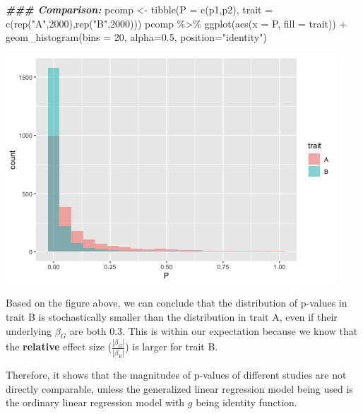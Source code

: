 \documentclass[
]{article}
\newenvironment{Shaded}{\begin{snugshade}}{\end{snugshade}}
\newcommand{\AttributeTok}[1]{\textcolor[rgb]{0.77,0.63,0.00}{#1}}
\newcommand{\DecValTok}[1]{\textcolor[rgb]{0.00,0.00,0.81}{#1}}
\newcommand{\DocumentationTok}[1]{\textcolor[rgb]{0.56,0.35,0.01}{\textbf{\textit{#1}}}}
\newcommand{\FloatTok}[1]{\textcolor[rgb]{0.00,0.00,0.81}{#1}}
\newcommand{\FunctionTok}[1]{\textcolor[rgb]{0.00,0.00,0.00}{#1}}
\newcommand{\NormalTok}[1]{#1}
\newcommand{\OtherTok}[1]{\textcolor[rgb]{0.56,0.35,0.01}{#1}}
\newcommand{\SpecialCharTok}[1]{\textcolor[rgb]{0.00,0.00,0.00}{#1}}
\newcommand{\StringTok}[1]{\textcolor[rgb]{0.31,0.60,0.02}{#1}}
\begin{document}
\begin{Shaded}
\begin{Highlighting}[]
\DocumentationTok{\#\#\# Comparison:}
\NormalTok{pcomp }\OtherTok{\textless{}{-}} \FunctionTok{tibble}\NormalTok{(}\AttributeTok{P =} \FunctionTok{c}\NormalTok{(p1,p2), }\AttributeTok{trait =} \FunctionTok{c}\NormalTok{(}\FunctionTok{rep}\NormalTok{(}\StringTok{"A"}\NormalTok{,}\DecValTok{2000}\NormalTok{),}\FunctionTok{rep}\NormalTok{(}\StringTok{"B"}\NormalTok{,}\DecValTok{2000}\NormalTok{)))}
\NormalTok{pcomp }\SpecialCharTok{\%\textgreater{}\%} \FunctionTok{ggplot}\NormalTok{(}\FunctionTok{aes}\NormalTok{(}\AttributeTok{x =}\NormalTok{ P, }\AttributeTok{fill =}\NormalTok{ trait)) }\SpecialCharTok{+} \FunctionTok{geom\_histogram}\NormalTok{(}\AttributeTok{bins =} \DecValTok{20}\NormalTok{, }\AttributeTok{alpha=}\FloatTok{0.5}\NormalTok{, }\AttributeTok{position=}\StringTok{"identity"}\NormalTok{)}
\end{Highlighting}
\end{Shaded}

\includegraphics{GWAS-Pvalues_files/figure-latex/visualization-1.png}

Based on the figure above, we can conclude that the distribution of
p-values in trait B is stochastically smaller than the distribution in
trait A, even if their underlying \(\beta_G\) are both \(0.3\). This is
within our expectation because we know that the \textbf{relative} effect
size (\(\frac{|\beta_G|}{|\beta_E|}\)) is larger for trait B.

Therefore, it shows that the magnitudes of p-values of different studies
are not directly comparable, unless the generalized linear regression
model being used is the ordinary linear regression model with \(g\)
being identity function.
\end{document}
